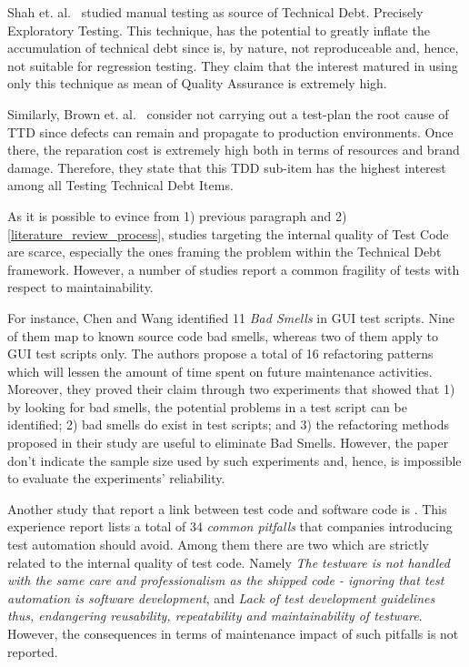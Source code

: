 Shah et. al.\ \cite{exploratorying_testing_td} studied manual testing as source of Technical Debt. Precisely Exploratory Testing. This technique, has the potential to greatly inflate the accumulation of technical debt since is, by nature, not reproduceable and, hence, not suitable for regression testing. They claim that the interest matured in using only this technique as mean of Quality Assurance is extremely high. 

Similarly, Brown et. al.\ \cite{td_current_vs_optimal_quality} consider not carrying out a test-plan the root cause of TTD since defects can remain and propagate to production environments. Once there, the reparation cost is extremely high both in terms of resources and brand damage. Therefore, they state that this TDD sub-item has the highest interest among all Testing Technical Debt Items.

As it is possible to evince from 1) previous paragraph and 2) \ref{literature_review_process}, studies targeting the internal quality of Test Code are scarce, especially the ones framing the problem within the Technical Debt framework. However, a number of studies report a common fragility of tests with respect to maintainability. 

For instance, Chen and Wang \cite{gui_scripts_bad_smells} identified 11 \textit{Bad Smells} in GUI test scripts. Nine of them map to known source code bad smells, whereas two of them apply to GUI test scripts only. The authors propose a total of 16 refactoring patterns which will lessen the amount of time spent on future maintenance activities. Moreover, they proved their claim through two experiments that showed that 1) by looking for bad smells, the potential problems in a test script can be identified; 2) bad smells do exist in test scripts; and 3) the refactoring methods proposed in their study are useful to eliminate Bad Smells. However, the paper don't indicate the sample size used by such experiments and, hence, is impossible to evaluate the experiments' reliability. 

Another study that report a link between test code and software code is \cite{pitfalls_in_introducing_regression_testing}. This experience report lists a total of 34 \textit{common pitfalls} that companies introducing test automation should avoid. Among them there are two which are strictly related to the internal quality of test code. Namely \textit{The testware is not handled with the same care and professionalism as the shipped code - ignoring that test automation is software development}, and \textit{Lack of test development guidelines thus, endangering reusability, repeatability and maintainability of testware}. However, the consequences in terms of maintenance impact of such pitfalls is not reported. 

